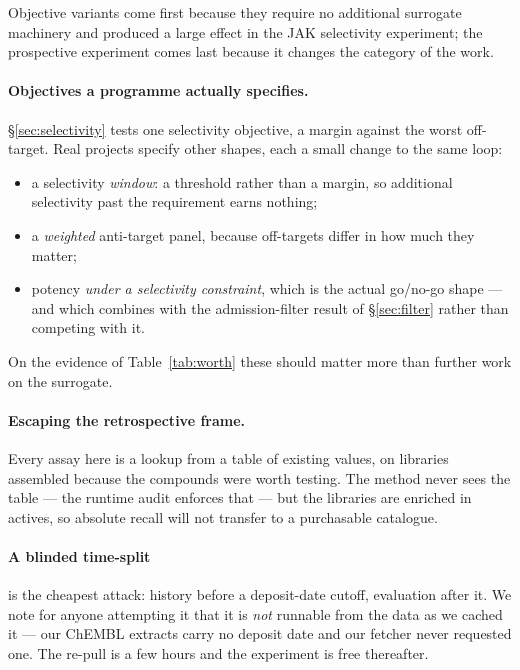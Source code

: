 \documentclass[11pt]{article}
\begin{document}
Objective variants come first because they require no additional surrogate
machinery and produced a large effect in the JAK selectivity experiment; the
prospective experiment comes last because it changes the category of the work.

\paragraph{Objectives a programme actually specifies.}

\S\ref{sec:selectivity} tests one selectivity objective, a margin against the
worst off-target. Real projects specify other shapes, each a small change to the
same loop:

\begin{itemize}[leftmargin=1.6em,itemsep=0.2em]
  \item a selectivity \emph{window}: a threshold rather than a margin, so
    additional selectivity past the requirement earns nothing;
  \item a \emph{weighted} anti-target panel, because off-targets differ in how
    much they matter;
  \item potency \emph{under a selectivity constraint}, which is the actual
    go/no-go shape --- and which combines with the admission-filter result of
    \S\ref{sec:filter} rather than competing with it.
\end{itemize}

On the evidence of Table~\ref{tab:worth} these should matter more than further
work on the surrogate.

\paragraph{Escaping the retrospective frame.}

Every assay here is a lookup from a table of existing values, on libraries
assembled because the compounds were worth testing. The method never sees the
table --- the runtime audit enforces that --- but the libraries are enriched in
actives, so absolute recall will not transfer to a purchasable catalogue.

\paragraph{A blinded time-split} is the cheapest attack: history before a
deposit-date cutoff, evaluation after it. We note for anyone attempting it that
it is \emph{not} runnable from the data as we cached it --- our ChEMBL extracts
carry no deposit date and our fetcher never requested one. The re-pull is a few
hours and the experiment is free thereafter.
\end{document}
